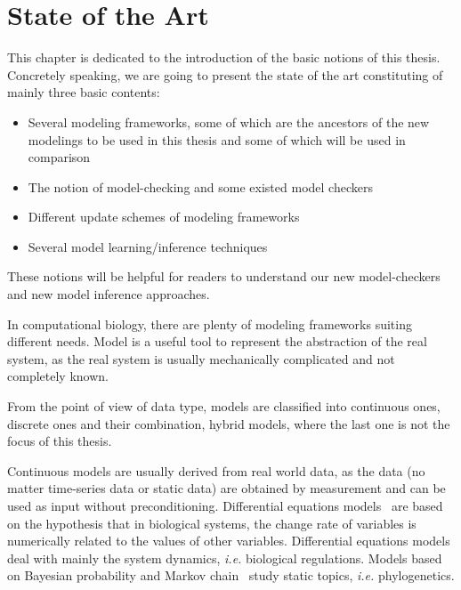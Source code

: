 \chapter{State of the Art}\label{chap:stateOfTheArt}

\begin{mybox}
This chapter is dedicated to the introduction of the basic notions of this thesis.
Concretely speaking, we are going to present the state of the art constituting of mainly three basic contents:

\begin{itemize}
    \item Several modeling frameworks, some of which are the ancestors of the new modelings to be used in this thesis and some of which will be used in comparison
    \item The notion of model-checking and some existed model checkers 
    \item Different update schemes of modeling frameworks
    \item Several model learning/inference techniques
\end{itemize}

These notions will be helpful for readers to understand our new model-checkers and new model inference approaches.
\end{mybox}

In computational biology, there are plenty of modeling frameworks suiting different needs.
Model is a useful tool to represent the abstraction of the real system, as the real system is usually mechanically complicated and not completely known.

From the point of view of data type, models are classified into continuous ones, discrete ones and their combination, hybrid models, where the last one is not the focus of this thesis.

Continuous models are usually derived from real world data, as the data (no matter time-series data or static data) are obtained by measurement and can be used as input without preconditioning.
Differential equations models~\cite{glass1973logical,snoussi1989qualitative,thomas1990biological} are based on the hypothesis that in biological systems, the change rate of variables is numerically related to the values of other variables. 
Differential equations models deal with mainly the system dynamics, \textit{i.e.} biological regulations.
Models based on Bayesian probability and Markov chain~\cite{huelsenbeck2001mrbayes,larget1999markov} study static topics, \textit{i.e.} phylogenetics.

